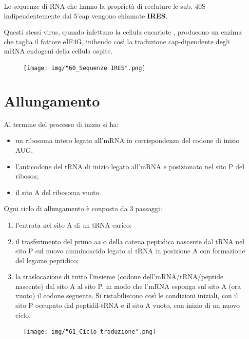 \documentclass[11pt]{book}
\begin{document}
Le sequenze di RNA che hanno la proprietà di reclutare le sub. 40S
indipendentemente dal 5'cap vengono chiamate \textbf{IRES}.

Questi stessi virus, quando infettano la cellula eucariote , producono
un enzima che taglia il fattore eIF4G, inibendo così la traduzione
cap-dipendente degli mRNA endogeni della cellula ospite.

\begin{figure}[htp]
\centering
\texttt{[image: img/"60\_Sequenze IRES".png]}
\caption{}
\label{sequenze-ires}
\end{figure}

\section{Allungamento}\label{allungamento}

Al termine del processo di inizio si ha:

\begin{itemize}
\itemsep1pt\parskip0pt
\item
  un ribosoma intero legato all'mRNA in corrispondenza del codone di
  inizio AUG;
\item
  l'anticodone del tRNA di inizio legato all'mRNA e posizionato nel sito
  P del ribosoa;
\item
  il sito A del ribosoma vuoto.
\end{itemize}

Ogni ciclo di allungamento è conposto da 3 passaggi:

\begin{enumerate}
\def\labelenumi{\arabic{enumi}.}
\itemsep1pt\parskip0pt
\item
  l'entrata nel sito A di un tRNA carico;
\item
  il trasferimento del primo aa o della catena peptidica nascente dal
  tRNA nel sito P sul nuovo amminoacido legato al tRNA in posizione A
  con formazione del legame peptidico;
\item
  la traslocazione di tutto l'insieme (codone dell'mRNA/tRNA/peptide
  nascente) dal sito A al sito P, in modo che l'mRNA esponga sul sito A
  (ora vuoto) il codone seguente. Si ristabiliscono così le condizioni
  iniziali, con il sito P occupato dal peptidil-tRNA e il sito A vuoto,
  con inizio di un nuovo ciclo.
\end{enumerate}

\begin{figure}[htp]
\centering
\texttt{[image: img/"61\_Ciclo traduzione".png]}
\caption{}
\label{ciclo-traduzione}
\end{figure}
\end{document}
